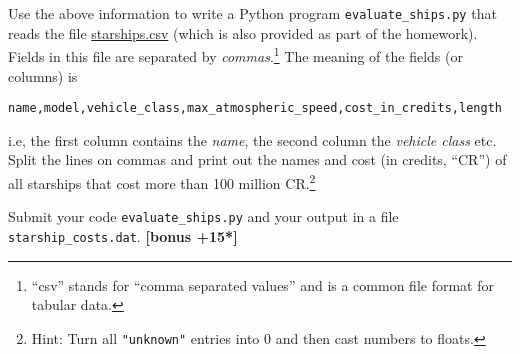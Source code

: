 \documentclass[letterpaper]{scrartcl}
\newcounter{TotalPoints}
\newcounter{TotalBonus}
\newcommand{\bonus}[1]{\textbf{[bonus +#1*]}\stepcounter{TotalBonus}}
\begin{document}
Use the above information to write a Python program
\texttt{evaluate\_ships.py} that reads the file
\href{https://github.com/ASU-CompMethodsPhysics-PHY494/PHY494-resources/blob/master/01_shell/data/starships.csv}{starships.csv}
(which is also provided as part of the homework). Fields in this file
are separated by \emph{commas}.\footnote{``csv'' stands for ``comma
  separated values'' and is a common file format for tabular data.}
The meaning of the fields (or columns) is
\begin{verbatim}
name,model,vehicle_class,max_atmospheric_speed,cost_in_credits,length
\end{verbatim}
i.e, the first column contains the \emph{name}, the second column the
\emph{vehicle class} etc. Split the lines on commas and print out the
names and cost (in credits, ``CR'') of all starships that cost more
than 100 million CR.\footnote{Hint: Turn all \texttt{"unknown"}
  entries into 0 and then cast numbers to floats.}

Submit your code \texttt{evaluate\_ships.py} and your output in a file
\texttt{starship\_costs.dat}.  \bonus{15}




\end{document}
